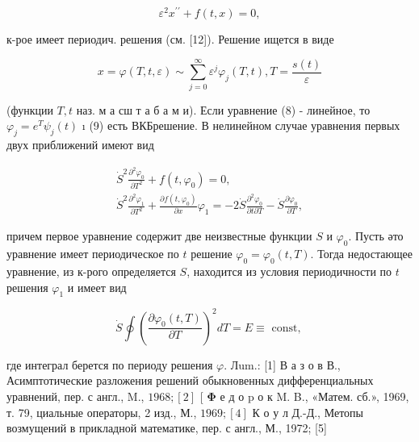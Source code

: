 \documentclass[10pt]{article}
\begin{document}
\[

\varepsilon^{2} x^{\prime \prime}+f(t, x)=0,

\]



к-рое имеет периодич. решения (см. [12]). Решение ищется в виде



\[

x=\varphi(T, t, \varepsilon) \sim \sum_{j=0}^{\infty} \varepsilon^{j} \varphi_{j}(T, t), T=\frac{s(t)}{\varepsilon}

\]



(функции $T, t$ наз. м а сш т а б а м и). Если уравнение (8) - линейное, то $\varphi_{j}=e^{T} \psi_{j}(t)$ ı (9) есть ВКБрешение. В нелинейном случае уравнения первых двух приближений имеют вид



\[

\begin{gathered}

\dot{S}^{2} \frac{\partial^{2} \varphi_{0}}{\partial T^{2}}+f\left(t, \varphi_{0}\right)=0, \\

\dot{S}^{2} \frac{\partial^{2} \varphi_{1}}{\partial T^{2}}+\frac{\partial f\left(t, \varphi_{0}\right)}{\partial x} \varphi_{1}=-2 \dot{S} \frac{\partial^{2} \varphi_{0}}{\partial t \partial T}-\dot{S} \frac{\partial \varphi_{0}}{\partial T},

\end{gathered}

\]



причем первое уравнение содержит две неизвестные функции $S$ и $\varphi_{0}$. Пусть әто уравнение имеет периодическое по $t$ решение $\varphi_{0}=\varphi_{0}(t, T)$. Тогда недостающее уравнение, из к-рого определяется $S$, находится из условия периодичности по $t$ решения $\varphi_{1}$ и имеет вид



\[

\dot{S} \oint\left(\frac{\partial \varphi_{0}(t, T)}{\partial T}\right)^{2} d T=E \equiv \text { const, }

\]



где интеграл берется по периоду решения $\varphi$. Лum.: [1] В а з о в В., Асимптотические разложения решений обыкновенных дифференциальных уравнений, пер. с англ., M., $1968 ;[2]$ [ $\mathbf{\Phi}$ е д о p о к M. B., «Матем. сб.», 1969, т. 79, циальные операторы, 2 изд., М., $1969 ;[4]$ К о у л Д.-Д., Метопы возмущений в прикладной математике, пер. с англ., М., 1972; [5]
\end{document}
